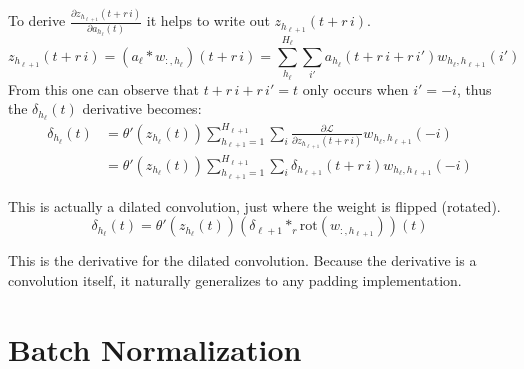 To derive $\frac{\partial z_{h_{\ell+1}}(t + r\, i)}{\partial a_{h_\ell}(t)}$ it helps to write out $z_{h_{\ell+1}}(t + r\, i)$.
\begin{equation}
z_{h_{\ell+1}}(t + r\, i) = (a_{\ell} * w_{:,h_\ell})(t + r\, i) = \sum_{h_\ell}^{H_\ell} \sum_{i'} a_{h_\ell}(t + r\, i + r\, i') w_{h_\ell, h_{\ell+1}}(i')
\end{equation}
From this one can observe that $t + r\, i + r\, i' = t$ only occurs when $i' = -i$, thus the $\delta_{h_\ell}(t)$ derivative becomes:
\begin{equation}
\begin{aligned}
\delta_{h_\ell}(t) &= \theta'(z_{h_\ell}(t)) \sum_{h_{\ell+1}=1}^{H_{\ell+1}} \sum_{i} \frac{\partial \mathcal{L}}{\partial z_{h_{\ell+1}}(t + r\, i)} w_{h_\ell, h_{\ell+1}}(-i) \\
&= \theta'(z_{h_\ell}(t)) \sum_{h_{\ell+1}=1}^{H_{\ell+1}} \sum_{i} \delta_{h_{\ell+1}}(t + r\, i) w_{h_\ell, h_{\ell+1}}(-i)
\end{aligned}
\end{equation}

This is actually a dilated convolution, just where the weight is flipped (rotated).
\begin{equation}
\delta_{h_\ell}(t) = \theta'(z_{h_\ell}(t)) (\delta_{\ell + 1} *_r \mathrm{rot}(w_{:, h_{\ell + 1}}))(t)
\end{equation}

This is the derivative for the dilated convolution. Because the derivative is a convolution itself, it naturally generalizes to any padding implementation. 

\clearpage
\section{Batch Normalization}
\label{appendix:backward-pass:batch-norm}

